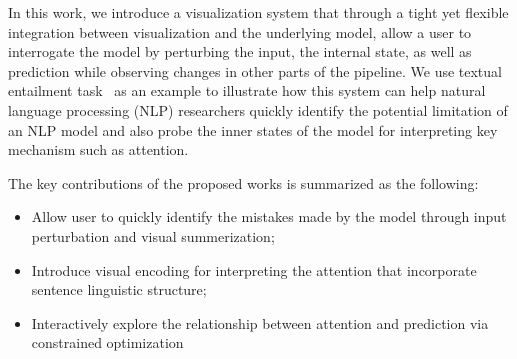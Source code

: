 In this work, we introduce a visualization system that through a tight yet flexible integration between visualization and the underlying model, allow a user to interrogate the model by perturbing the input, the internal state, as well as prediction while observing changes in other parts of the pipeline.
We use textual entailment task~\cite{} as an example to illustrate how this system can help natural language processing (NLP) researchers quickly identify the potential limitation of an NLP model and also probe the inner states of the model for interpreting key mechanism such as attention.

%
%


The key contributions of the proposed works is summarized as the following:
\begin{itemize}
    \item Allow user to quickly identify the mistakes made by the model through input perturbation and visual summerization;

    \item Introduce visual encoding for interpreting the attention that incorporate sentence linguistic structure;

    \item Interactively explore the relationship between attention and prediction via constrained optimization
\end{itemize}

%
%
